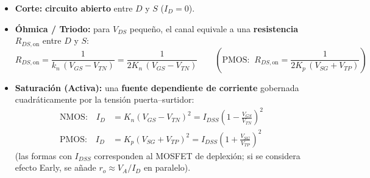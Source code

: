 \documentclass[11pt,a4paper]{article}
\begin{document}
	\begin{itemize}
		\item \textbf{Corte:} \textbf{circuito abierto} entre $D$ y $S$ ($I_D = 0$).
		\item \textbf{Óhmica / Triodo:} para $V_{DS}$ pequeño, el canal equivale a una \textbf{resistencia} $R_{DS,\mathrm{on}}$ entre $D$ y $S$:
		\[
		R_{DS,\mathrm{on}} = \frac{1}{k_n\,(V_{GS} - V_{TN})} = \frac{1}{2K_n\,(V_{GS} - V_{TN})}
		\qquad
		\left(\text{PMOS:}\;\; R_{DS,\mathrm{on}} = \frac{1}{2K_p\,(V_{SG} + V_{TP})}\right)
		\]
		\item \textbf{Saturación (Activa):} una \textbf{fuente dependiente de corriente} gobernada cuadráticamente por la tensión puerta--surtidor:
		\begin{align*}
			\text{NMOS:}\quad I_D &= K_n(V_{GS} - V_{TN})^2 = I_{DSS}\!\left(1 - \frac{V_{GS}}{V_{TN}}\right)^2 \\[0.3em]
			\text{PMOS:}\quad I_D &= K_p(V_{SG} + V_{TP})^2 = I_{DSS}\!\left(1 + \frac{V_{SG}}{V_{TP}}\right)^2
		\end{align*}
		(las formas con $I_{DSS}$ corresponden al MOSFET de deplexión; si se considera efecto Early, se añade $r_o \approx V_A / I_D$ en paralelo).
	\end{itemize}
\end{document}
